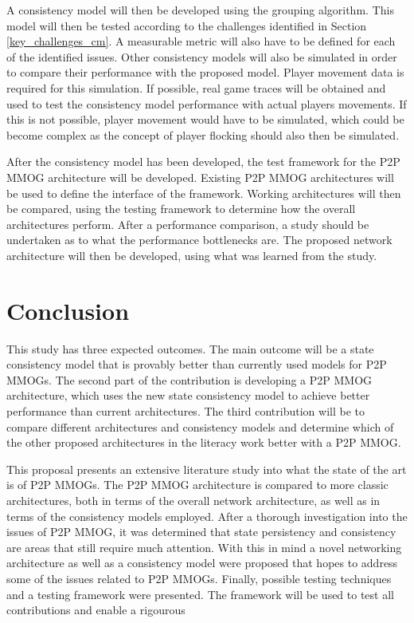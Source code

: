 \documentclass[journal,oneside,a4paper,onecolumn]{IEEEtran}
\begin{document}
A consistency model will then be developed using the grouping algorithm. This model will then be tested according to the challenges identified in Section \ref{key_challenges_cm}. A measurable metric will also have to be defined for each of the identified issues. Other consistency models will also be simulated in order to compare their performance with the proposed model. Player movement data is required for this simulation. If possible, real game traces will be obtained and used to test the consistency model performance with actual players movements. If this is not possible, player movement would have to be simulated, which could be become complex as the concept of player flocking should also then be simulated.

After the consistency model has been developed, the test framework for the P2P MMOG architecture will be developed. Existing P2P MMOG architectures will be used to define the interface of the framework. Working architectures will then be compared, using the testing framework to determine how the overall architectures perform. After a performance comparison, a study should be undertaken as to what the performance bottlenecks are. The proposed network architecture will then be developed, using what was learned from the study.


\section{Conclusion}

This study has three expected outcomes. The main outcome will be a state consistency model that is provably better than currently used models for P2P MMOGs. The second part of the contribution is developing a P2P MMOG architecture, which uses the new state consistency model to achieve better performance than current architectures. The third contribution will be to compare different architectures and consistency models and determine which of the other proposed architectures in the literacy work better with a P2P MMOG.

This proposal presents an extensive literature study into what the state of the art is of P2P MMOGs. The P2P MMOG architecture is compared to more classic architectures, both in terms of the overall network architecture, as well as in terms of the consistency models employed. After a thorough investigation into the issues of P2P MMOG, it was determined that state persistency and consistency are areas that still require much attention. With this in mind a novel networking architecture as well as a consistency model were proposed that hopes to address some of the issues related to P2P MMOGs. Finally, possible testing techniques and a testing framework were presented. The framework will be used to test all contributions and enable a rigourous

\newpage



\end{document}
